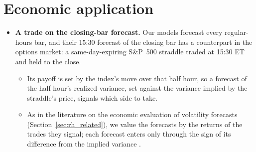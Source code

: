 

\section{Economic application}
\label{sec:rh_econ}
\begin{itemize}
\item \textbf{A trade on the closing-bar forecast.} Our models forecast every regular-hours bar, and their
  15:30 forecast of the closing bar has a counterpart in the options market: a same-day-expiring S\&P~500 straddle
  traded at 15:30 ET and held to the close.
  \begin{itemize}
  \item Its payoff is set by the index's move over that half hour, so a forecast of the half hour's realized
    variance, set against the variance implied by the straddle's price, signals which side to take.
  \item As in the literature on the economic evaluation of volatility forecasts (Section~\ref{sec:rh_related}), we
    value the forecasts by the returns of the trades they signal; each forecast enters only through the sign of its
    difference from the implied variance \citep{FlemingKirbyOstdiek2001}.
  \end{itemize}
\end{itemize}

